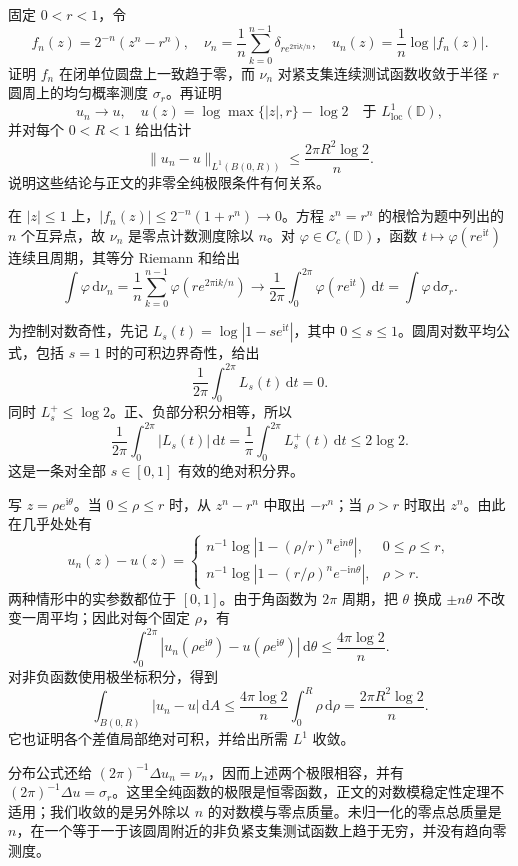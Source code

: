 \begin{exercise}[趋零函数的归一化零点分布]\label{b3:ex:18-draft-05}
固定 \(0<r<1\)，令
\[
 f_n(z)=2^{-n}(z^n-r^n),\quad
 \nu_n=\frac1n\sum_{k=0}^{n-1}\delta_{r e^{2\pi\mathrm i k/n}},\quad
 u_n(z)=\frac1n\log|f_n(z)|.
\]
证明 \(f_n\) 在闭单位圆盘上一致趋于零，而 \(\nu_n\) 对紧支集连续测试函数收敛于半径 \(r\) 圆周上的均匀概率测度 \(\sigma_r\)。再证明
\[
 u_n\longrightarrow u,\quad
 u(z)=\log\max\{|z|,r\}-\log2
 \quad\text{于 }L^1_{\mathrm{loc}}(\mathbb D),
\]
并对每个 \(0<R<1\) 给出估计
\[
 \|u_n-u\|_{L^1(B(0,R))}\le\frac{2\pi R^2\log2}{n}.
\]
说明这些结论与正文的非零全纯极限条件有何关系。
\end{exercise}
\begin{solution}
在 \(|z|\le1\) 上，\(|f_n(z)|\le2^{-n}(1+r^n)\to0\)。方程 \(z^n=r^n\) 的根恰为题中列出的 \(n\) 个互异点，故 \(\nu_n\) 是零点计数测度除以 \(n\)。对 \(\varphi\in C_c(\mathbb D)\)，函数 \(t\mapsto\varphi(re^{\mathrm it})\) 连续且周期，其等分 Riemann 和给出
\[
 \int\varphi\,\mathrm d\nu_n
 =\frac1n\sum_{k=0}^{n-1}\varphi(re^{2\pi\mathrm i k/n})
 \longrightarrow\frac1{2\pi}\int_0^{2\pi}\varphi(re^{\mathrm it})\,\mathrm dt
 =\int\varphi\,\mathrm d\sigma_r.
\]

为控制对数奇性，先记 \(L_s(t)=\log|1-se^{\mathrm it}|\)，其中 \(0\le s\le1\)。圆周对数平均公式，包括 \(s=1\) 时的可积边界奇性，给出
\[
 \frac1{2\pi}\int_0^{2\pi}L_s(t)\,\mathrm dt=0.
\]
同时 \(L_s^+\le\log2\)。正、负部分积分相等，所以
\[
 \frac1{2\pi}\int_0^{2\pi}|L_s(t)|\,\mathrm dt
 =\frac1\pi\int_0^{2\pi}L_s^+(t)\,\mathrm dt
 \le2\log2.
\]
这是一条对全部 \(s\in[0,1]\) 有效的绝对积分界。

写 \(z=\rho e^{\mathrm i\theta}\)。当 \(0\le\rho\le r\) 时，从 \(z^n-r^n\) 中取出 \(-r^n\)；当 \(\rho>r\) 时取出 \(z^n\)。由此在几乎处处有
\[
 u_n(z)-u(z)=
 \begin{cases}
 n^{-1}\log|1-(\rho/r)^ne^{\mathrm in\theta}|,&0\le\rho\le r,\\
 n^{-1}\log|1-(r/\rho)^ne^{-\mathrm in\theta}|,&\rho>r.
 \end{cases}
\]
两种情形中的实参数都位于 \([0,1]\)。由于角函数为 \(2\pi\) 周期，把 \(\theta\) 换成 \(\pm n\theta\) 不改变一周平均；因此对每个固定 \(\rho\)，有
\[
 \int_0^{2\pi}|u_n(\rho e^{\mathrm i\theta})-u(\rho e^{\mathrm i\theta})|
 \,\mathrm d\theta\le\frac{4\pi\log2}{n}.
\]
对非负函数使用极坐标积分，得到
\[
 \int_{B(0,R)}|u_n-u|\,\mathrm dA
 \le\frac{4\pi\log2}{n}\int_0^R\rho\,\mathrm d\rho
 =\frac{2\pi R^2\log2}{n}.
\]
它也证明各个差值局部绝对可积，并给出所需 \(L^1\) 收敛。

分布公式还给 \((2\pi)^{-1}\Delta u_n=\nu_n\)，因而上述两个极限相容，并有 \((2\pi)^{-1}\Delta u=\sigma_r\)。这里全纯函数的极限是恒零函数，正文的对数模稳定性定理不适用；我们收敛的是另外除以 \(n\) 的对数模与零点质量。未归一化的零点总质量是 \(n\)，在一个等于一于该圆周附近的非负紧支集测试函数上趋于无穷，并没有趋向零测度。
\end{solution}

